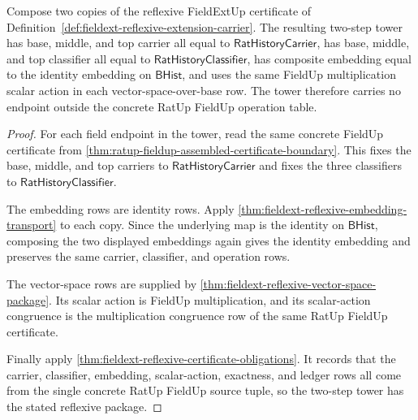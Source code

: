 \begin{theorem}
\label{thm:fieldext-ratup-reflexive-tower-composition}
Compose two copies of the reflexive FieldExtUp certificate of
Definition~\ref{def:fieldext-reflexive-extension-carrier}. The resulting
two-step tower has base, middle, and top carrier all equal to
$\mathsf{RatHistoryCarrier}$, has base, middle, and top classifier all equal
to $\mathsf{RatHistoryClassifier}$, has composite embedding equal to the
identity embedding on $\mathsf{BHist}$, and uses the same FieldUp
multiplication scalar action in each vector-space-over-base row. The tower
therefore carries no endpoint outside the concrete RatUp FieldUp operation
table.
\end{theorem}
\begin{proof}
For each field endpoint in the tower, read the same concrete FieldUp
certificate from
\autoref{thm:ratup-fieldup-assembled-certificate-boundary}. This fixes the
base, middle, and top carriers to $\mathsf{RatHistoryCarrier}$ and fixes the
three classifiers to $\mathsf{RatHistoryClassifier}$.

The embedding rows are identity rows. Apply
\autoref{thm:fieldext-reflexive-embedding-transport} to each copy. Since the
underlying map is the identity on $\mathsf{BHist}$, composing the two displayed
embeddings again gives the identity embedding and preserves the same carrier,
classifier, and operation rows.

The vector-space rows are supplied by
\autoref{thm:fieldext-reflexive-vector-space-package}. Its scalar action is
FieldUp multiplication, and its scalar-action congruence is the multiplication
congruence row of the same RatUp FieldUp certificate.

Finally apply
\autoref{thm:fieldext-reflexive-certificate-obligations}. It records that the
carrier, classifier, embedding, scalar-action, exactness, and ledger rows all
come from the single concrete RatUp FieldUp source tuple, so the two-step
tower has the stated reflexive package.
\end{proof}

